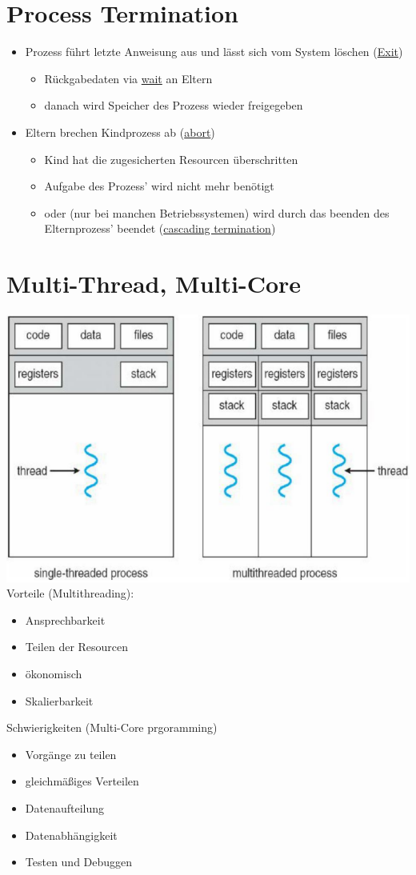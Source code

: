 \documentclass[a4paper]{scrreprt}
\begin{document}
\section{Process Termination}
	\begin{itemize}
		\item Prozess führt letzte Anweisung aus und lässt sich vom System löschen (\underline{Exit})
		\begin{itemize}
			\item Rückgabedaten via \underline{wait} an Eltern
			\item danach wird Speicher des Prozess wieder freigegeben
		\end{itemize}
		\item Eltern brechen Kindprozess ab (\underline{abort})
		\begin{itemize}
			\item Kind hat die zugesicherten Resourcen überschritten
			\item Aufgabe des Prozess' wird nicht mehr benötigt
			\item oder (nur bei manchen Betriebssystemen) wird durch das beenden des Elternprozess' beendet (\underline{cascading termination})
		\end{itemize}
	\end{itemize}

\section{Multi-Thread, Multi-Core}
	\includegraphics[scale = 0.4]{graphics/threads.png}\\
	Vorteile (Multithreading):
	\begin{itemize}
		\item Ansprechbarkeit
		\item Teilen der Resourcen
		\item ökonomisch
		\item Skalierbarkeit
	\end{itemize}
	Schwierigkeiten (Multi-Core prgoramming)
	\begin{itemize}
		\item Vorgänge zu teilen
		\item gleichmäßiges Verteilen
		\item Datenaufteilung
		\item Datenabhängigkeit
		\item Testen und Debuggen
	\end{itemize}
\end{document}
